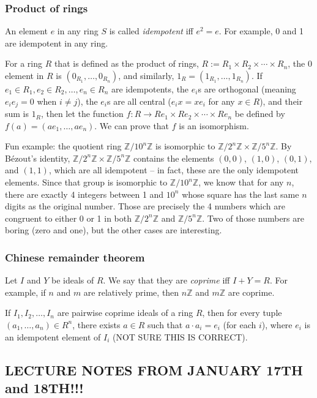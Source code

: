 \documentclass[12pt]{article}
\begin{document}
\subsubsection{Product of rings}
An element $e$ in any ring $S$ is called \textit{idempotent} iff $e^2=e$. For example, 0 and 1 are idempotent in any ring.
\par
For a ring $R$ that is defined as the product of rings, $R := R_1 \times R_2 \times \cdots \times R_n$, the 0 element in $R$ is $(0_{R_1}, \dots, 0_{R_n})$, and similarly, $1_R = (1_{R_1}, \dots, 1_{R_n})$. If $e_1 \in R_1, e_2 \in R_2, \dots, e_n \in R_n$ are idempotents, the $e_i$s are orthogonal (meaning $e_i e_j =0$ when $i \neq j$), the $e_i$s are all central ($e_ix=xe_i$ for any $x \in R$), and their sum is $1_R$, then let the function $f: R \rightarrow Re_1 \times Re_2 \times \cdots \times Re_n$ be defined by $f(a)=(ae_1, \dots, ae_n)$. We can prove that $f$ is an isomorphism.
\par
Fun example: the quotient ring $ \mathbb{Z}/10^n\mathbb{Z}$ is isomorphic to $\mathbb{Z}/2^n\mathbb{Z} \times \mathbb{Z}/5^n\mathbb{Z}$. By Bézout's identity, $\mathbb{Z}/2^n\mathbb{Z} \times \mathbb{Z}/5^n\mathbb{Z}$ contains the elements $(0,0)$, $(1,0)$, $(0,1)$, and $(1,1)$, which are all idempotent -- in fact, these are the only idempotent elements. Since that group is isomorphic to $ \mathbb{Z}/10^n\mathbb{Z}$, we know that for any $n$, there are exactly 4 integers between 1 and $10^n$ whose square has the last same $n$ digits as the original number. Those are precisely the 4 numbers which are congruent to either 0 or 1 in both $ \mathbb{Z}/2^n\mathbb{Z}$ and $ \mathbb{Z}/5^n\mathbb{Z}$. Two of those numbers are boring (zero and one), but the other cases are interesting.

\subsubsection{Chinese remainder theorem}
Let $I$ and $Y$ be ideals of $R$. We say that they are \textit{coprime} iff $I+Y=R$. For example, if $n$ and $m$ are relatively prime, then $n \mathbb{Z}$ and $m \mathbb{Z}$ are coprime.
\par
If $I_1, I_2, \dots, I_n$ are pairwise coprime ideals of a ring $R$, then for every tuple $(a_1, \dots, a_n) \in R^n$, there exists $a \in R$ such that $a\cdot a_i = e_i$ (for each $i$), where $e_i$ is an idempotent element of $I_i$ (NOT SURE THIS IS CORRECT).

\subsection{LECTURE NOTES FROM JANUARY 17TH and 18TH!!!}
\end{document}
